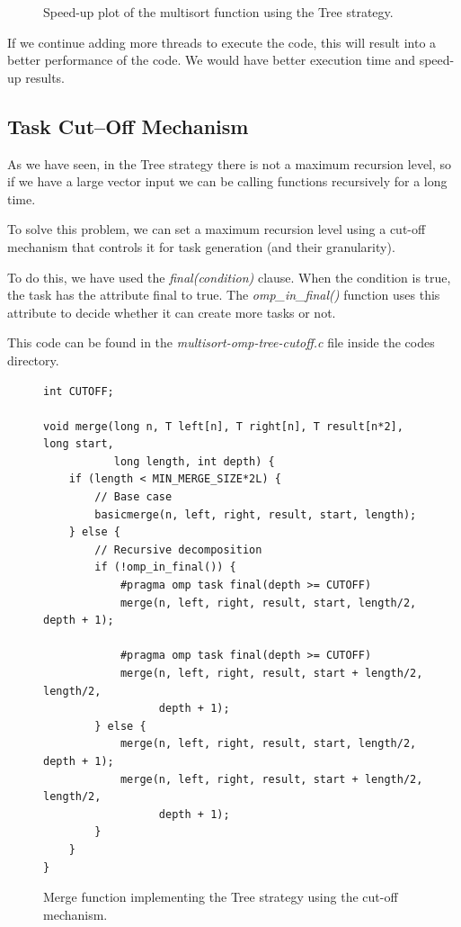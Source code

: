 \documentclass[12pt, a4paper]{article}
\begin{document}
\begin{figure}[H]
\begin{minipage}[b]{0.4\linewidth}
  \caption{Speed-up plot of the multisort function using the Tree strategy.}
  \label{fig:mandel-omp-10000-strong-21-speedup}
\end{minipage}
\end{figure}

If we continue adding more threads to execute the code, this will result into a better performance of the code. We would have better execution time and speed-up results.

\subsection{Task Cut–Off Mechanism}

As we have seen, in the Tree strategy there is not a maximum recursion level, so if we have a large vector input we can be calling functions recursively for a long time.

To solve this problem, we can set a maximum recursion level using a cut-off mechanism that controls it for task generation (and their granularity).

To do this, we have used the \textit{final(condition)} clause. When the condition is true, the task has the attribute final to true. The \textit{omp\_in\_final()} function uses this attribute to decide whether it can create more tasks or not.

This code can be found in the \textit{multisort-omp-tree-cutoff.c} file inside the codes directory.

\begin{figure}[H]
\begin{lstlisting}
int CUTOFF;

void merge(long n, T left[n], T right[n], T result[n*2], long start,
		   long length, int depth) {
    if (length < MIN_MERGE_SIZE*2L) {
        // Base case
        basicmerge(n, left, right, result, start, length);
    } else {
        // Recursive decomposition
        if (!omp_in_final()) {
			#pragma omp task final(depth >= CUTOFF)
			merge(n, left, right, result, start, length/2, depth + 1);
			
			#pragma omp task final(depth >= CUTOFF)
			merge(n, left, right, result, start + length/2, length/2,
				  depth + 1);
		} else {
			merge(n, left, right, result, start, length/2, depth + 1);
			merge(n, left, right, result, start + length/2, length/2,
				  depth + 1);
		}
    }
}
\end{lstlisting}

\caption{Merge function implementing the Tree strategy using the cut-off mechanism.}
\end{figure}
\end{document}
